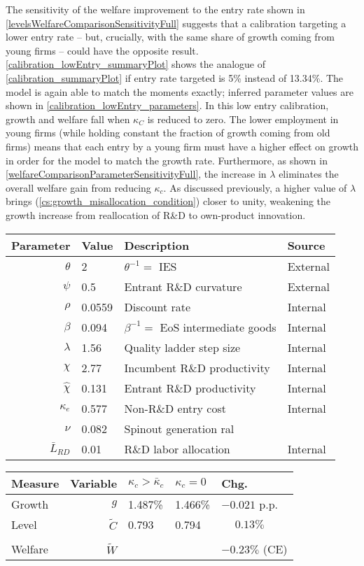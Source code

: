 \documentclass[11pt,english]{article}
\theoremstyle{definition}
\begin{document}
The sensitivity of the welfare improvement to the entry rate shown in \autoref{levelsWelfareComparisonSensitivityFull} suggests that a calibration targeting a lower entry rate -- but, crucially, with the same share of growth coming from young firms -- could have the opposite result. \autoref{calibration_lowEntry_summaryPlot} shows the analogue of \autoref{calibration_summaryPlot} if entry rate targeted is 5\% instead of 13.34\%. The model is again able to match the moments exactly; inferred parameter values are shown in \autoref{calibration_lowEntry_parameters}. In this low entry calibration, growth and welfare fall when $\kappa_C$ is reduced to zero. The lower employment in young firms (while holding constant the fraction of growth coming from old firms) means that each entry by a young firm must have a higher effect on growth in order for the model to match the growth rate. Furthermore, as shown in \autoref{welfareComparisonParameterSensitivityFull}, the increase in $\lambda$ eliminates the overall welfare gain from reducing $\kappa_c$. As discussed previously, a higher value of $\lambda$ brings (\ref{cs:growth_misallocation_condition}) closer to unity, weakening the growth increase from reallocation of R\&D to own-product innovation.

\begin{table}[]
	\centering
	\label{calibration_lowEntry_parameters}
	\begin{tabular}{rlll}
		\toprule \toprule
		Parameter & Value & Description & Source \tabularnewline
		\midrule
		$\theta$ & 2 & $\theta^{-1} = $ IES & External 
		\tabularnewline
		$\psi$ & 0.5 & Entrant R\&D curvature & External \tabularnewline
		$\rho$ & 0.0559 & Discount rate  & Internal \tabularnewline
		$\beta$ & 0.094 & $\beta^{-1} = $ EoS intermediate goods & Internal \tabularnewline 
		$\lambda$ & 1.56 & Quality ladder step size & Internal 
		\tabularnewline
		$\chi$ & 2.77 & Incumbent R\&D productivity & Internal 
		\tabularnewline
		$\hat{\chi}$ & 0.131 & Entrant R\&D productivity & Internal \tabularnewline 
		$\kappa_e$ & 0.577 & Non-R\&D entry cost & Internal \tabularnewline
		$\nu$ & 0.082 & Spinout generation ral\tabularnewline
		$\bar{L}_{RD}$ & 0.01 & R\&D labor allocation  & Internal \tabularnewline
		\bottomrule
	\end{tabular}
\end{table}

\begin{table}
	\centering
	\label{reducing_kappa_c_table_lowEntry}
	\begin{tabular}{lrlll}
		\toprule \toprule
		Measure & Variable & $\kappa_c > \bar{\kappa}_c$ & $\kappa_c = 0$ & Chg. \tabularnewline
		\midrule
		Growth & $g$ & 1.487\% & 1.466\% & $-0.021$ p.p. \tabularnewline
		Level & $\tilde{C}$  & 0.793 &  0.794 & $\phantom{-}0.13\%$ \tabularnewline 
		\tabularnewline
		Welfare & $\tilde{W}$  &  & & $-0.23\%$ (CE)  \tabularnewline
		\bottomrule
	\end{tabular}
\end{table}
\end{document}
